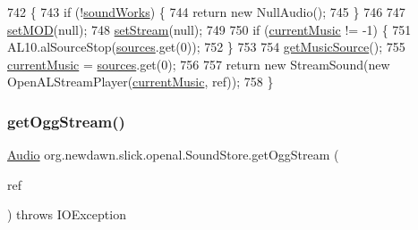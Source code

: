 \begin{DoxyCode}
742                                                              \{
743         \textcolor{keywordflow}{if} (!\mbox{\hyperlink{classorg_1_1newdawn_1_1slick_1_1openal_1_1_sound_store_ae563e9c1a01e333dc2350f1450f451fd}{soundWorks}}) \{
744             \textcolor{keywordflow}{return} \textcolor{keyword}{new} NullAudio();
745         \}
746         
747         \mbox{\hyperlink{classorg_1_1newdawn_1_1slick_1_1openal_1_1_sound_store_a2c4b2292d9999e9ab7afa5ac5ac27224}{setMOD}}(null);
748         \mbox{\hyperlink{classorg_1_1newdawn_1_1slick_1_1openal_1_1_sound_store_ab22cf64fd9231d5b4455bf31d7893f85}{setStream}}(null);
749         
750         \textcolor{keywordflow}{if} (\mbox{\hyperlink{classorg_1_1newdawn_1_1slick_1_1openal_1_1_sound_store_a533d86a926110a3d75449fa186015f07}{currentMusic}} != -1) \{
751             AL10.alSourceStop(\mbox{\hyperlink{classorg_1_1newdawn_1_1slick_1_1openal_1_1_sound_store_a3a2ffa73acd847102bb30140129c440b}{sources}}.get(0));
752         \}
753         
754         \mbox{\hyperlink{classorg_1_1newdawn_1_1slick_1_1openal_1_1_sound_store_ac2d5dca8d89e5fe899691ddb4be2fc12}{getMusicSource}}();
755         \mbox{\hyperlink{classorg_1_1newdawn_1_1slick_1_1openal_1_1_sound_store_a533d86a926110a3d75449fa186015f07}{currentMusic}} = \mbox{\hyperlink{classorg_1_1newdawn_1_1slick_1_1openal_1_1_sound_store_a3a2ffa73acd847102bb30140129c440b}{sources}}.get(0);
756         
757         \textcolor{keywordflow}{return} \textcolor{keyword}{new} StreamSound(\textcolor{keyword}{new} OpenALStreamPlayer(\mbox{\hyperlink{classorg_1_1newdawn_1_1slick_1_1openal_1_1_sound_store_a533d86a926110a3d75449fa186015f07}{currentMusic}}, ref));
758     \}
\end{DoxyCode}
\mbox{\label{classorg_1_1newdawn_1_1slick_1_1openal_1_1_sound_store_a613504c1c1d42980a936f02701fc1433}} 
\subsubsection{\texorpdfstring{get\+Ogg\+Stream()}{getOggStream()}\hspace{0.1cm}{\footnotesize\ttfamily [2/2]}}
{\footnotesize\ttfamily \mbox{\hyperlink{interfaceorg_1_1newdawn_1_1slick_1_1openal_1_1_audio}{Audio}} org.\+newdawn.\+slick.\+openal.\+Sound\+Store.\+get\+Ogg\+Stream (\begin{DoxyParamCaption}\item[{U\+RL}]{ref }\end{DoxyParamCaption}) throws I\+O\+Exception\hspace{0.3cm}{\ttfamily [inline]}}

